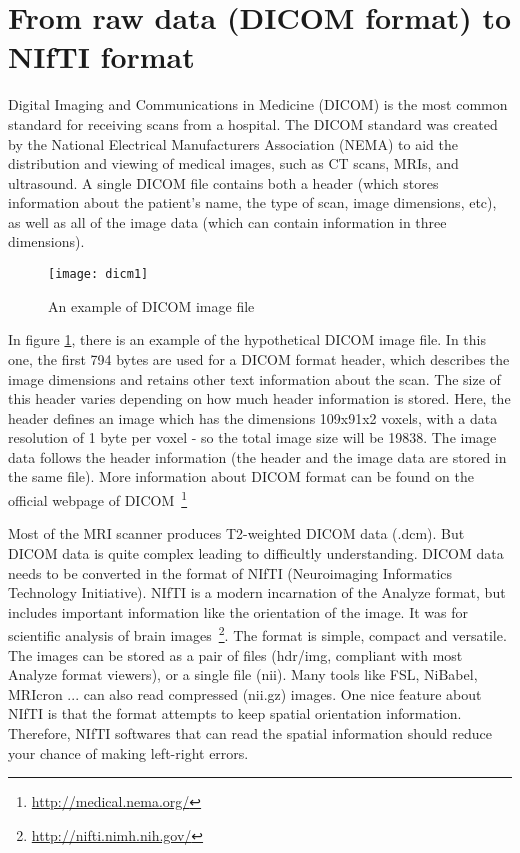 

\section{From raw data (DICOM format) to NIfTI format}
\label{sec:raw_to_nifti}
Digital Imaging and Communications in Medicine (DICOM) is the most common standard for receiving scans from a hospital. The DICOM standard was created by the National Electrical Manufacturers Association (NEMA) to aid the distribution and viewing of medical images, such as CT scans, MRIs, and ultrasound. A single DICOM file contains both a header (which stores information about the patient's name, the type of scan, image dimensions, etc), as well as all of the image data (which can contain information in three dimensions). 
\begin{figure} 
  \centering 
  \texttt{[image: dicm1]}
  \caption{An example of DICOM image file}
  \label{Fig:dicom_example}
\end{figure}

In figure \ref{Fig:dicom_example}, there is an example of the hypothetical DICOM image file. In this one, the first 794 bytes are used for a DICOM format header, which describes the image dimensions and retains other text information about the scan. The size of this header varies depending on how much header information is stored. Here, the header defines an image which has the dimensions 109x91x2 voxels, with a data resolution of 1 byte per voxel - so the total image size will be 19838. The image data follows the header information (the header and the image data are stored in the same file). More information about DICOM format can be found on the official webpage of DICOM~\footnote{\url{http://medical.nema.org/}}

Most of the MRI scanner produces T2-weighted DICOM data (.dcm). But DICOM data is quite complex leading to difficultly understanding. DICOM data needs to be converted in the format of NIfTI (Neuroimaging Informatics Technology Initiative). NIfTI is a modern incarnation of the Analyze format, but includes important information like the orientation of the image. It was for scientific analysis of brain images~\footnote{\url{http://nifti.nimh.nih.gov/}}. The format is simple, compact and versatile. The images can be stored as a pair of files (hdr/img, compliant with most Analyze format viewers), or a single file (nii). Many tools like FSL, NiBabel, MRIcron ... can also read compressed (nii.gz) images. One nice feature about NIfTI is that the format attempts to keep spatial orientation information. Therefore, NIfTI softwares that can read the spatial information should reduce your chance of making left-right errors. 


